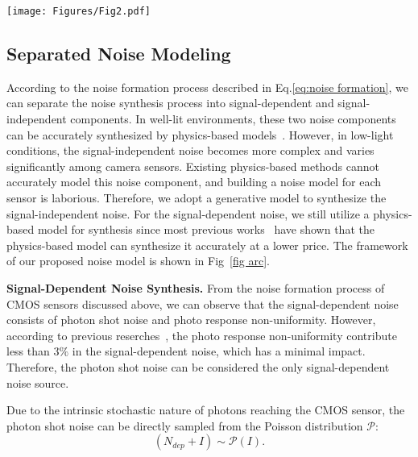 \documentclass[10pt,twocolumn,letterpaper]{article}
\begin{document}
\begin{figure*}[htbp]
\centering
\texttt{[image: Figures/Fig2.pdf]}
\caption{Overview of the framework. The proposed noise model is divided into three components: (a) signal-dependent noise synthesis, (b) signal-independent noise synthesis, and (c) domain alignment. Please refer to Sec.~\ref{method} for more detailed descriptions.}
\label{fig arc}
\vspace{-2ex}
\end{figure*}

\subsection{Separated Noise Modeling}
According to the noise formation process described in Eq.\eqref{eq:noise formation}, we can separate the noise synthesis process into signal-dependent and signal-independent components. In well-lit environments, these two noise components can be accurately synthesized by physics-based models~\cite{zhang2021rethinking}. However, in low-light conditions, the signal-independent noise becomes more complex and varies significantly among camera sensors. Existing physics-based methods cannot accurately model this noise component, and building a noise model for each sensor is laborious. Therefore, we adopt a generative model to synthesize the signal-independent noise. For the signal-dependent noise, we still utilize a physics-based model for synthesis since most previous works~\cite{foi2009clipped,wei2020physics,zhang2021rethinking} have shown that the physics-based model can synthesize it accurately at a lower price. The framework of our proposed noise model is shown in Fig~\ref{fig arc}.

\textbf{Signal-Dependent Noise Synthesis.} From the noise formation process of CMOS sensors discussed above, we can observe that the signal-dependent noise consists of photon shot noise and photo response non-uniformity. However, according to previous reserches~\cite{gow2007comprehensive,janesick1987scientific}, the photo response non-uniformity contribute less than $3\%$ in the signal-dependent noise, which has a minimal impact. Therefore, the photon shot noise can be considered the only signal-dependent noise source.

Due to the intrinsic stochastic nature of photons reaching the CMOS sensor, the photon shot noise can be directly sampled from the Poisson distribution $\mathcal{P}$:
\begin{equation}
    (N_{dep}+I) \sim \mathcal{P}(I) .
\end{equation}
\end{document}
